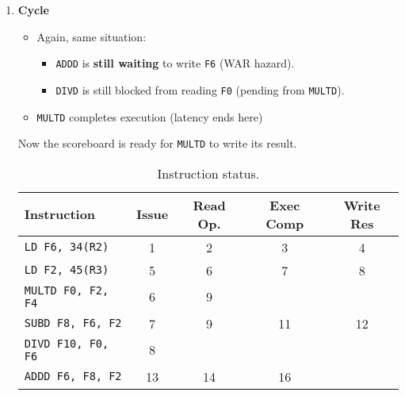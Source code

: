 \begin{enumerate}
    \newpage


    \item \textbf{Cycle \theenumi}
    \begin{itemize}
        \item Again, same situation:
        \begin{itemize}
            \item \texttt{ADDD} is \textbf{still waiting} to write \texttt{F6} (WAR hazard).
            \item \texttt{DIVD} is still blocked from reading \texttt{F0} (pending from \texttt{MULTD}).
        \end{itemize}
        \item \texttt{MULTD} completes execution (latency ends here)
    \end{itemize}
    Now the scoreboard is ready for \texttt{MULTD} to write its result.

    \begin{table}[!htp]
        \centering
        \begin{tabular}{@{} l | c c c c @{}}
            \toprule
            Instruction                 & Issue     & Read Op.  & Exec Comp & Write Res \\
            \midrule
            \texttt{LD    F6, 34(R2)}   & 1         & 2         & 3         & 4         \\ [.3em]
            \texttt{LD    F2, 45(R3)}   & 5         & 6         & 7         & 8         \\ [.3em]
            \texttt{MULTD F0, F2, F4}   & 6         & 9         &           &           \\ [.3em]
            \texttt{SUBD  F8, F6, F2}   & 7         & 9         & 11        & 12        \\ [.3em]
            \texttt{DIVD  F10, F0, F6}  & 8         &           &           &           \\ [.3em]
            \texttt{ADDD  F6, F8, F2}   & 13        & 14        & 16        &           \\
            \bottomrule
        \end{tabular}
        \caption*{Instruction status.}
    \end{table}


\end{enumerate}
